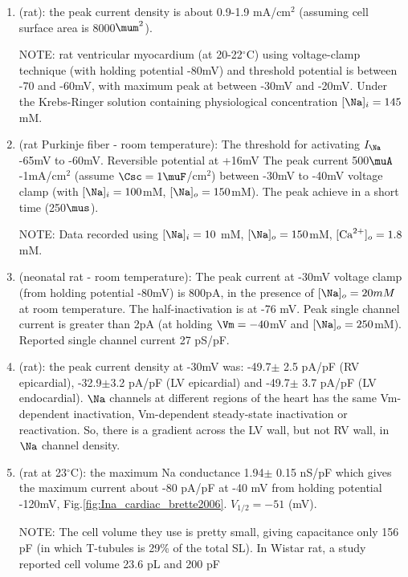 \begin{enumerate}
  \item \citep{brown1981} (rat): the peak current  density is about 0.9-1.9
  mA/cm$^2$ (assuming cell surface area is 8000$\mum^2$).
  
NOTE: rat ventricular myocardium (at 20-22$^\circ$C) using
  voltage-clamp technique (with holding potential -80mV) and threshold potential
  is between -70 and -60mV, with maximum peak at between -30mV and -20mV. Under
  the Krebs-Ringer solution  containing physiological concentration
  $[\Na]_i=145$mM.
  
   \item \citep{Fozzard1986} (rat Purkinje fiber - room temperature): The
   threshold for activating $I_\Na$ -65mV to -60mV. Reversible potential at
   +16mV The peak current 500$\muA$-1mA/cm$^2$ (assume $\Csc=1\muF$/cm$^2$)
   between -30mV to -40mV voltage clamp (with $[\Na]_i=100$mM, $[\Na]_o=150$mM).
   The peak achieve in a short time (250$\mus$).
   
NOTE: Data recorded using $[\Na]_i=10$ mM, $[\Na]_o=150$mM, $[{\text{Ca}^{2+}}]_o=1.8$mM. 
   
   \item \citep{lee1999} (neonatal rat - room temperature): The peak current at
   -30mV voltage clamp (from holding potential -80mV) is 800pA, in the presence
   of $[\Na]_o=20mM$ at room temperature. The half-inactivation is at -76 mV.
   Peak single channel current is greater than 2pA (at holding $\Vm=-40$mV and
   $[\Na]_o=250$mM). Reported single channel current 27 pS/pF.
   
  \item \citep{ashamalla2001} (rat): the peak current density at -30mV was:
  -49.7$\pm$ 2.5 pA/pF (RV epicardial), -32.9$\pm$3.2 pA/pF (LV epicardial) and -49.7$\pm$
  3.7 pA/pF (LV endocardial). $\Na$ channels at different regions of the heart
  has the same Vm-dependent inactivation, Vm-dependent steady-state
  inactivation or reactivation. So, there is a gradient across the LV wall, but
  not RV wall, in $\Na$ channel density.
  
  \item \citep{brette2006} (rat at 23$^\circ$C): the maximum Na conductance
  1.94$\pm$ 0.15 nS/pF which gives the maximum current about -80 pA/pF at -40 mV
  from holding potential -120mV, Fig.\ref{fig:Ina_cardiac_brette2006}.
  $V_{1/2}=-51$ (mV).
  
NOTE: The cell volume they use is pretty small, giving capacitance only 156 pF
(in which T-tubules is 29\% of the total SL). In Wistar rat, a study reported
cell volume 23.6 pL and 200 pF \citep{swift2006} 
\end{enumerate}

